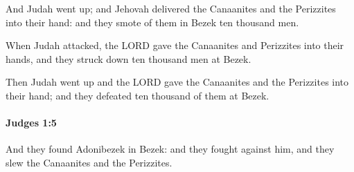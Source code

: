			\begin{versebox}
					\item[BHS] 
					\item[ASV] And Judah went up; and Jehovah delivered the Canaanites and the Perizzites into their hand: and they smote of them in Bezek ten thousand men.
					\item[NIV] When Judah attacked, the LORD gave the Canaanites and Perizzites into their hands, and they struck down ten thousand men at Bezek.
					\item[NRSV] Then Judah went up and the LORD gave the Canaanites and the Perizzites into their hand; and they defeated ten thousand of them at Bezek.
			\end{versebox}

		\paragraph{Judges 1:5} %
			\label{JUDGES-1-5}

			And they found Adonibezek in Bezek: and they fought against him, and they slew the Canaanites and the Perizzites.

